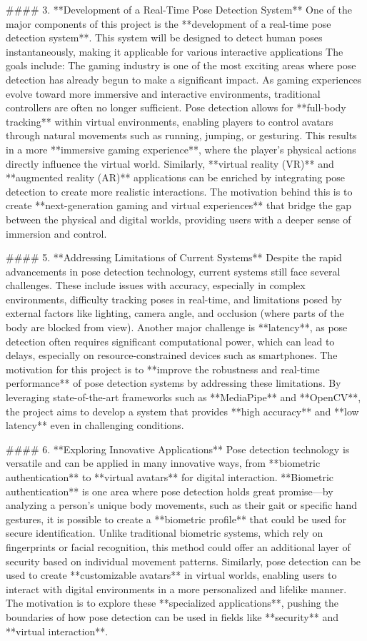 \documentclass[a4paper,12pt]{report}
\begin{document}
#### 3. **Development of a Real-Time Pose Detection System**
   One of the major components of this project is the **development of a real-time pose detection system**. This system will be designed to detect human poses instantaneously, making it applicable for various interactive applications The goals include:
   The gaming industry is one of the most exciting areas where pose detection has already begun to make a significant impact. As gaming experiences evolve toward more immersive and interactive environments, traditional controllers are often no longer sufficient. Pose detection allows for **full-body tracking** within virtual environments, enabling players to control avatars through natural movements such as running, jumping, or gesturing. This results in a more **immersive gaming experience**, where the player’s physical actions directly influence the virtual world. Similarly, **virtual reality (VR)** and **augmented reality (AR)** applications can be enriched by integrating pose detection to create more realistic interactions. The motivation behind this is to create **next-generation gaming and virtual experiences** that bridge the gap between the physical and digital worlds, providing users with a deeper sense of immersion and control.

#### 5. **Addressing Limitations of Current Systems**
   Despite the rapid advancements in pose detection technology, current systems still face several challenges. These include issues with accuracy, especially in complex environments, difficulty tracking poses in real-time, and limitations posed by external factors like lighting, camera angle, and occlusion (where parts of the body are blocked from view). Another major challenge is **latency**, as pose detection often requires significant computational power, which can lead to delays, especially on resource-constrained devices such as smartphones. The motivation for this project is to **improve the robustness and real-time performance** of pose detection systems by addressing these limitations. By leveraging state-of-the-art frameworks such as **MediaPipe** and **OpenCV**, the project aims to develop a system that provides **high accuracy** and **low latency** even in challenging conditions.

#### 6. **Exploring Innovative Applications**
   Pose detection technology is versatile and can be applied in many innovative ways, from **biometric authentication** to **virtual avatars** for digital interaction. **Biometric authentication** is one area where pose detection holds great promise—by analyzing a person’s unique body movements, such as their gait or specific hand gestures, it is possible to create a **biometric profile** that could be used for secure identification. Unlike traditional biometric systems, which rely on fingerprints or facial recognition, this method could offer an additional layer of security based on individual movement patterns. Similarly, pose detection can be used to create **customizable avatars** in virtual worlds, enabling users to interact with digital environments in a more personalized and lifelike manner. The motivation is to explore these **specialized applications**, pushing the boundaries of how pose detection can be used in fields like **security** and **virtual interaction**.
\end{document}
